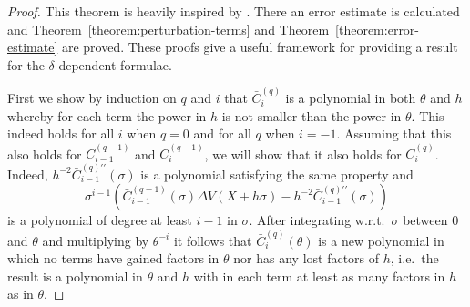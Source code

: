 \begin{proof}
    This theorem is heavily inspired by \cite{ixaru_cp_1998}. There an error estimate is calculated and Theorem~\ref{theorem:perturbation-terms} and Theorem~\ref{theorem:error-estimate} are proved. These proofs give a useful framework for providing a result for the $\delta$-dependent formulae.


    First we show by induction on $q$ and $i$ that $\bar{C}_{i}^{(q)}$ is a polynomial in both $\theta$ and $h$ whereby for each term the power in $h$ is not smaller than the power in $\theta$. This indeed holds for all $i$ when $q=0$ and for all $q$ when $i=-1$.
    Assuming that this also holds for $\bar{C}_{i-1}^{(q-1)}$ and $\bar{C}_{i}^{(q-1)}$, we will show that it also holds for $\bar{C}_{i}^{(q)}$. Indeed,
    $h^{-2}\bar{C}_{i-1}^{(q)\prime\prime}(\sigma)$ is a polynomial satisfying the same property and
    $$
        \sigma^{i-1} \left(
        \bar{C}_{i-1}^{(q-1)}(\sigma) \Delta V(X+h\sigma) - h^{-2} \bar{C}_{i-1}^{(q)\prime\prime}(\sigma)
        \right)
    $$
    is a polynomial of degree at least $i-1$ in $\sigma$. After integrating w.r.t.\ $\sigma$ between $0$ and $\theta$ and multiplying by $\theta^{-i}$
    it follows that $\bar{C}_{i}^{(q)}(\theta)$ is a new polynomial in which no terms have gained factors in $\theta$ nor has any lost factors of $h$, i.e.\
    the result is a polynomial in $\theta$ and $h$ with in each term at least as many factors in $h$ as in $\theta$.


\end{proof}
